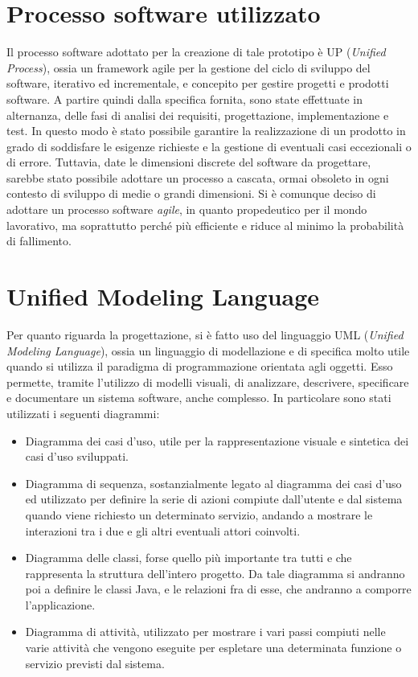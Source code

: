 \section{Processo software utilizzato}
Il processo software adottato per la creazione di tale prototipo è UP (\textit{Unified Process}), ossia un framework agile per la gestione del ciclo di sviluppo del software, iterativo ed incrementale, e concepito per gestire progetti e prodotti software. A partire quindi dalla specifica fornita, sono state effettuate in alternanza, delle fasi di analisi dei requisiti, progettazione, implementazione e test. In questo modo è stato possibile garantire la realizzazione di un prodotto in grado di soddisfare le esigenze richieste e la gestione di eventuali casi eccezionali o di errore. Tuttavia, date le dimensioni discrete del software da progettare, sarebbe stato possibile adottare un processo a cascata, ormai obsoleto in ogni contesto di sviluppo di medie o grandi dimensioni. Si è comunque deciso di adottare un processo software \textit{agile}, in quanto propedeutico per il mondo lavorativo, ma soprattutto perché più efficiente e riduce al minimo la probabilità di fallimento.

\section{Unified Modeling Language}
Per quanto riguarda la progettazione, si è fatto uso del linguaggio UML (\textit{Unified Modeling Language}), ossia un linguaggio di modellazione e di specifica molto utile quando si utilizza il paradigma di programmazione orientata agli oggetti. Esso permette, tramite l’utilizzo di modelli visuali, di analizzare, descrivere, specificare e documentare un sistema software, anche complesso. In particolare sono stati utilizzati i seguenti diagrammi:
\begin{itemize}
    \item Diagramma dei casi d'uso, utile per la rappresentazione visuale e sintetica dei casi d'uso sviluppati.
    \item Diagramma di sequenza, sostanzialmente legato al diagramma dei casi d'uso ed utilizzato per definire la serie di azioni compiute dall'utente e dal sistema quando viene richiesto un determinato servizio, andando a mostrare le interazioni tra i due e gli altri eventuali attori coinvolti.
    \item Diagramma delle classi, forse quello più importante tra tutti e che rappresenta la struttura dell'intero progetto. Da tale diagramma si andranno poi a definire le classi Java, e le relazioni fra di esse, che andranno a comporre l'applicazione.
    \item Diagramma di attività, utilizzato per mostrare i vari passi compiuti nelle varie attività che vengono eseguite per espletare una determinata funzione o servizio previsti dal sistema.
\end{itemize}

